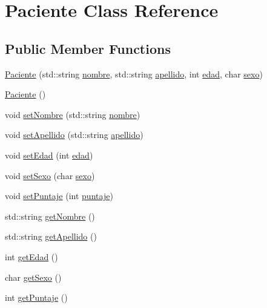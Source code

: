 \hypertarget{class_paciente}{\section{Paciente Class Reference}
\label{class_paciente}
}
\subsection*{Public Member Functions}
\begin{DoxyCompactItemize}
\item 
\hyperlink{class_paciente_ad669d580c3afbbf010c582060a7290b8}{Paciente} (std\+::string \hyperlink{class_paciente_aa038dc802c746b2ceb990400aca1bf92}{nombre}, std\+::string \hyperlink{class_paciente_adaa241cbab07b786730e27b82e303616}{apellido}, int \hyperlink{class_paciente_a5a873f7b3df047548f58ec7a9d4ca29c}{edad}, char \hyperlink{class_paciente_aaf0b95139b3d6bf6f475b52050b8613c}{sexo})
\item 
\hyperlink{class_paciente_a97757a37cee1fed63091afd4fced0263}{Paciente} ()
\item 
void \hyperlink{class_paciente_a3d6dc888957a7485e85606181f528e0c}{set\+Nombre} (std\+::string \hyperlink{class_paciente_aa038dc802c746b2ceb990400aca1bf92}{nombre})
\item 
void \hyperlink{class_paciente_a30883cdacfd7ee5d38c7f579a956bdbc}{set\+Apellido} (std\+::string \hyperlink{class_paciente_adaa241cbab07b786730e27b82e303616}{apellido})
\item 
void \hyperlink{class_paciente_ab82e12433466172891e1bfa141ffbeb3}{set\+Edad} (int \hyperlink{class_paciente_a5a873f7b3df047548f58ec7a9d4ca29c}{edad})
\item 
void \hyperlink{class_paciente_ac2f26fb57513c075fe5bb23668693d5f}{set\+Sexo} (char \hyperlink{class_paciente_aaf0b95139b3d6bf6f475b52050b8613c}{sexo})
\item 
void \hyperlink{class_paciente_a9f4c05ae7dd16c3a9c5754ee1f8e13b5}{set\+Puntaje} (int \hyperlink{class_paciente_a42560c348305a28a57a59294294f59f8}{puntaje})
\item 
std\+::string \hyperlink{class_paciente_aa00955a7fd2b8e1992ef8bbdc4bc05d1}{get\+Nombre} ()
\item 
std\+::string \hyperlink{class_paciente_a35268fbb91b9266d4ed472104e16097e}{get\+Apellido} ()
\item 
int \hyperlink{class_paciente_a1da1c5831ca77c232862b99e34ffaf50}{get\+Edad} ()
\item 
char \hyperlink{class_paciente_a9ae18f33cfaa0bd38cc653220fab5c63}{get\+Sexo} ()
\item 
int \hyperlink{class_paciente_a38b72c2025e29dfd0f2313273360a67f}{get\+Puntaje} ()
\end{DoxyCompactItemize}
